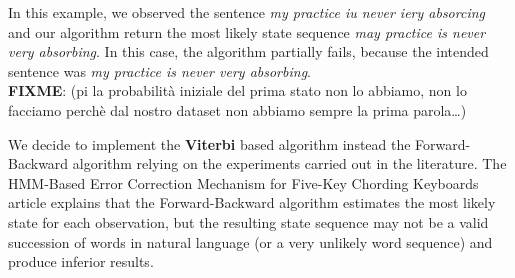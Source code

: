 In this example, we observed the sentence \textsl{my practice iu never iery absorcing} and our algorithm return the most 
likely state sequence \textsl{may practice is never very absorbing}. In this case, the algorithm partially fails, because the 
intended sentence was \textsl{my practice is never very absorbing}.
\\
\textbf{FIXME}: (pi la probabilità iniziale del prima stato non lo abbiamo, non lo facciamo perchè dal nostro dataset non 
abbiamo sempre la prima parola…)

We decide to implement the \textbf{Viterbi} based algorithm instead the Forward-Backward algorithm relying on the 
experiments carried out in the literature.
The HMM-Based Error Correction Mechanism for Five-Key Chording Keyboards article \cite{tarniceriu2015hmm} explains 
that the Forward-Backward algorithm estimates the most likely state for each observation, but the resulting state 
sequence may not be a valid succession of words in natural language (or a very unlikely word sequence) and produce 
inferior results.


